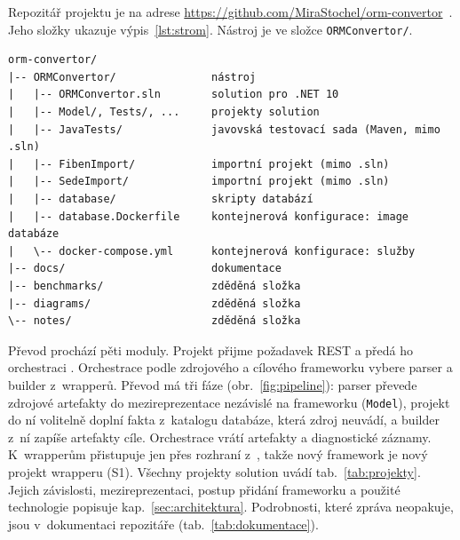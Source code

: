 Repozitář projektu je na adrese \url{https://github.com/MiraStochel/orm-convertor}~\cite{fork-repo}. Jeho složky ukazuje výpis~\ref{lst:strom}. Nástroj je ve složce \texttt{ORMConvertor/}.

\noindent\begin{minipage}{\linewidth}
\begin{lstlisting}[caption={Složky repozitáře.},label={lst:strom}]
orm-convertor/
|-- ORMConvertor/               nástroj
|   |-- ORMConvertor.sln        solution pro .NET 10
|   |-- Model/, Tests/, ...     projekty solution
|   |-- JavaTests/              javovská testovací sada (Maven, mimo .sln)
|   |-- FibenImport/            importní projekt (mimo .sln)
|   |-- SedeImport/             importní projekt (mimo .sln)
|   |-- database/               skripty databází
|   |-- database.Dockerfile     kontejnerová konfigurace: image databáze
|   \-- docker-compose.yml      kontejnerová konfigurace: služby
|-- docs/                       dokumentace
|-- benchmarks/                 zděděná složka
|-- diagrams/                   zděděná složka
\-- notes/                      zděděná složka
\end{lstlisting}
\end{minipage}

Převod prochází pěti moduly. Projekt  přijme požadavek REST a předá ho orchestraci . Orchestrace podle zdrojového a cílového frameworku vybere parser a builder z~wrapperů. Převod má tři fáze (obr.~\ref{fig:pipeline}): parser převede zdrojové artefakty do mezireprezentace nezávislé na frameworku (\texttt{Model}), projekt  do ní volitelně doplní fakta z~katalogu databáze, která zdroj neuvádí, a builder z~ní zapíše artefakty cíle. Orchestrace vrátí artefakty a diagnostické záznamy. K~wrapperům přistupuje jen přes rozhraní z~, takže nový framework je nový projekt wrapperu (S1). Všechny projekty solution uvádí tab.~\ref{tab:projekty}. Jejich závislosti, mezireprezentaci, postup přidání frameworku a použité technologie popisuje kap.~\ref{sec:architektura}. Podrobnosti, které zpráva neopakuje, jsou v~dokumentaci repozitáře (tab.~\ref{tab:dokumentace}).

